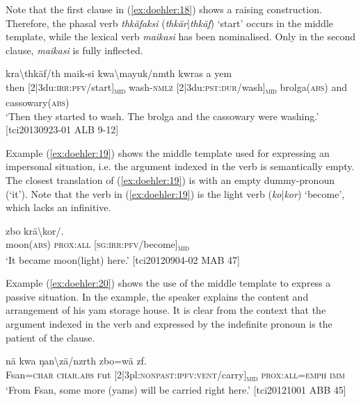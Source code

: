 \documentclass[output=paper]{langscibook}
\begin{document}
Note that the first clause in (\ref{ex:doehler:18}) shows a raising construction. Therefore, the phasal verb \emph{thkäfaksi} (\emph{thkär}|\emph{thkäf}) `start' occurs in the middle template, while the lexical verb \emph{maikasi} has been nominalised. Only in the second clause, \emph{maikasi} is fully inflected.


\ea
	\label{ex:doehler:18}
	 {kra\textbackslash{thkäf}/th} {maik-si} {kwa\textbackslash{mayuk}/nmth} {kwras} {a} {yem}\\
	then [2|3du:\textsc{irr}:\textsc{pfv}/start]\textsubscript{\textsc{mid}} wash-\textsc{nmlz}{} [2|3du:\textsc{pst}:\textsc{dur}/wash]\textsubscript{\textsc{mid}} brolga(\textsc{abs}) and cassowary(\textsc{abs})\\
	\glt `Then they started to wash. The brolga and the cassowary were washing.' [tci20130923-01 ALB 9-12]
\z



Example (\ref{ex:doehler:19}) shows the middle template used for expressing an impersonal situation, i.e. the argument indexed in the verb is semantically empty. The closest translation of (\ref{ex:doehler:19}) is with an empty dummy-pronoun (`it'). Note that the verb in (\ref{ex:doehler:19}) is the light verb (\emph{ko}|\emph{kor}) `become', which lacks an infinitive. 


\ea
	\label{ex:doehler:19}
	 {zbo} {krä\textbackslash{kor}/}.\\
	moon(\textsc{abs}) \textsc{prox}:\textsc{all}{} [\textsc{sg}:\textsc{irr}:\textsc{pfv}/become]\textsubscript{\textsc{mid}}\\
	\glt `It became moon(light) here.' [tci20120904-02 MAB 47] %
\z


Example (\ref{ex:doehler:20}) shows the use of the middle template to express a passive situation. In the example, the speaker explains the content and arrangement of his yam storage house. It is clear from the context that the argument indexed in the verb and expressed by the indefinite pronoun is the patient of the clause.


\ea
	 {nä} {kwa} {ŋan\textbackslash{zä}/nzrth} {zbo=wä} {zf}.\\
	Fsan=\textsc{char}{} \textsc{char}.\textsc{abs}{} \textsc{f}ut{} [2|3pl:\textsc{nonpast}:\textsc{ipfv}:\textsc{vent}/carry]\textsubscript{\textsc{mid}} \textsc{prox}:\textsc{all}=\textsc{emph}{} \textsc{imm}\\
	\glt `From Fsan, some more (yams) will be carried right here.' [tci20121001 ABB 45]
	\label{ex:doehler:20}
	\z
\end{document}
